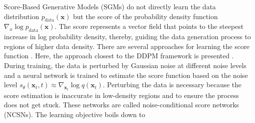Score-Based Generative Models (\gls{SGM}s) \cite{SGM, ImprovedSGMs} do not directly learn the data distribution $p_\text{data}(\mathbf{x})$ but the score of the probability density function $\nabla_x \log p_\text{data}(\mathbf{x})$. The score represents a vector field that points to the steepest increase in log probability density, thereby, guiding the data generation process to regions of higher data density. There are several approaches for learning the score function \cite{SDE,SteinDiscrepancy,SlicedScoreMatching}. Here, the approach closest to the \gls{DDPM} framework is presented \cite{SGM}. During training, the data is perturbed by Gaussian noise at different noise levels and a neural network is trained to estimate the score function based on the noise level $s_\theta(\mathbf{x}_t, t) \approx \nabla_{\mathbf{x}_t} \log q(\mathbf{x}_t)$. Perturbing the data is necessary because the score estimation is inaccurate in low-density regions and to ensure the process does not get stuck. These networks are called noise-conditional score networks (\gls{NCSN}s). The learning objective boils down to 

